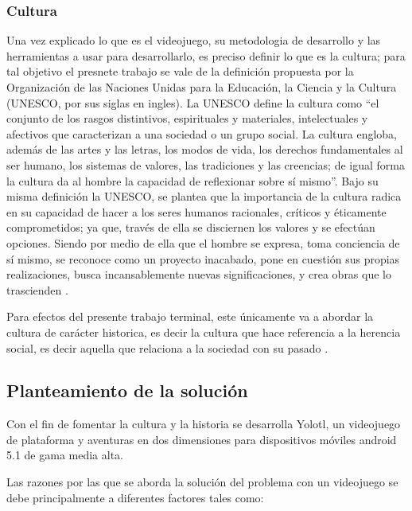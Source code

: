 \subsubsection{Cultura}
Una vez explicado lo que es el videojuego, su metodologia de desarrollo y las 
herramientas a usar para desarrollarlo, es preciso definir lo que es la cultura; 
para tal objetivo el presnete trabajo se vale de la definición propuesta por la 
Organización de las Naciones Unidas para la Educación, la Ciencia y la Cultura 
(UNESCO, por sus siglas en ingles). La UNESCO define la cultura como “el conjunto 
de los rasgos distintivos, espirituales y materiales, intelectuales y afectivos 
que caracterizan a una sociedad o un grupo social. La cultura engloba, además 
de las artes y las letras, los modos de vida, los derechos fundamentales al ser 
humano, los sistemas de valores, las tradiciones y las creencias; de igual forma 
la cultura da al hombre la capacidad de reflexionar sobre sí mismo\cite{RefCultura}”. 
Bajo su misma definición la UNESCO, se plantea que la importancia de la cultura 
radica en su capacidad de hacer a los seres humanos racionales, críticos y 
éticamente comprometidos; ya que, través de ella se disciernen los valores y se 
efectúan opciones. Siendo por medio de ella que el hombre se expresa, toma conciencia 
de sí mismo, se reconoce como un proyecto inacabado, pone en cuestión sus propias 
realizaciones, busca incansablemente nuevas significaciones, y crea obras que lo 
trascienden \cite{RefCultura}.
\\
\par
Para efectos del presente trabajo terminal, este únicamente va a abordar la cultura 
de carácter historica, es decir la cultura que hace referencia a la herencia social, 
es decir aquella que relaciona a la sociedad con su pasado
\cite{RefculturaClasificacionEl}.

\subsection{Planteamiento de la solución}
Con el fin de fomentar la cultura y la historia se desarrolla Yolotl, un videojuego 
de plataforma y aventuras en dos dimensiones para dispositivos móviles android 5.1 
de gama media alta.
\\
\par
Las razones por las que se aborda la solución del problema con un videojuego se 
debe principalmente a diferentes factores tales como:

